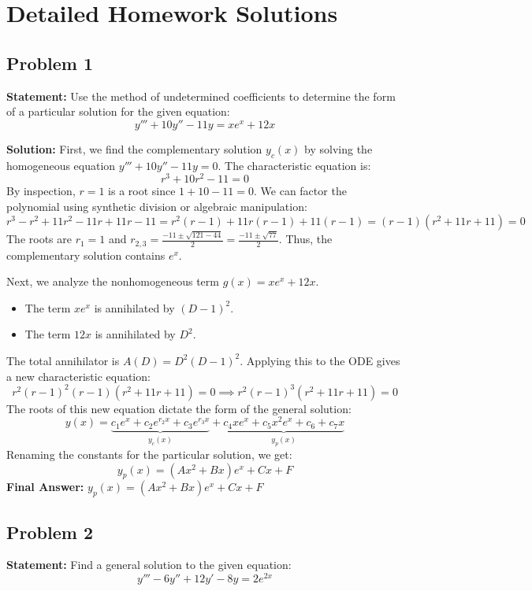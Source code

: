 \documentclass[11pt, a4paper]{article}
\theoremstyle{definition}
\theoremstyle{remark}
\begin{document}
\newpage
\section{Detailed Homework Solutions}

\subsection*{Problem 1}
\textbf{Statement:} Use the method of undetermined coefficients to determine the form of a particular solution for the given equation:
\[
y''' + 10y'' - 11y = xe^x + 12x
\]

\textbf{Solution:}
First, we find the complementary solution $y_c(x)$ by solving the homogeneous equation $y''' + 10y'' - 11y = 0$. The characteristic equation is:
\[
r^3 + 10r^2 - 11 = 0
\]
By inspection, $r = 1$ is a root since $1 + 10 - 11 = 0$. We can factor the polynomial using synthetic division or algebraic manipulation:
\[
r^3 - r^2 + 11r^2 - 11r + 11r - 11 = r^2(r-1) + 11r(r-1) + 11(r-1) = (r-1)(r^2 + 11r + 11) = 0
\]
The roots are $r_1 = 1$ and $r_{2,3} = \frac{-11 \pm \sqrt{121 - 44}}{2} = \frac{-11 \pm \sqrt{77}}{2}$. 
Thus, the complementary solution contains $e^x$.

Next, we analyze the nonhomogeneous term $g(x) = xe^x + 12x$.
\begin{itemize}
    \item The term $xe^x$ is annihilated by $(D-1)^2$.
    \item The term $12x$ is annihilated by $D^2$.
\end{itemize}
The total annihilator is $A(D) = D^2(D-1)^2$. Applying this to the ODE gives a new characteristic equation:
\[
r^2(r-1)^2 (r-1)(r^2 + 11r + 11) = 0 \implies r^2(r-1)^3(r^2 + 11r + 11) = 0
\]
The roots of this new equation dictate the form of the general solution:
\[
y(x) = \underbrace{c_1 e^x + c_2 e^{r_2 x} + c_3 e^{r_3 x}}_{y_c(x)} + \underbrace{c_4 x e^x + c_5 x^2 e^x + c_6 + c_7 x}_{y_p(x)}
\]
Renaming the constants for the particular solution, we get:
\[
y_p(x) = (Ax^2 + Bx)e^x + Cx + F
\]
\textbf{Final Answer:} $y_p(x) = (Ax^2 + Bx)e^x + Cx + F$

\vspace{1em}
\subsection*{Problem 2}
\textbf{Statement:} Find a general solution to the given equation:
\[
y''' - 6y'' + 12y' - 8y = 2e^{2x}
\]
\end{document}

